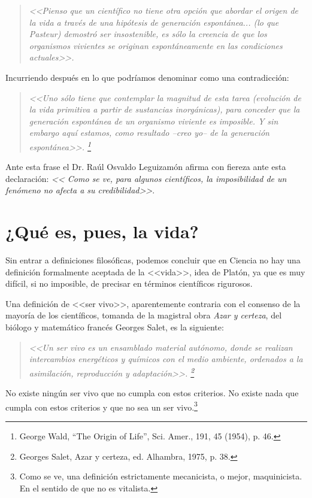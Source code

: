 \documentclass[11pt, oneside, titlepage]{book}
\begin{document}
    \begin{quote}
        \textit{
            <<Pienso que un científico no tiene otra opción que abordar el origen de la vida a través de una
            hipótesis de generación espontánea... (lo que Pasteur) demostró ser insostenible, es sólo la creencia
            de que los organismos vivientes se originan espontáneamente en las condiciones actuales>>.    
        }
    \end{quote}

    Incurriendo después en lo que podríamos denominar como una contradicción:

    \begin{quote}
        \textit{
            <<Uno sólo tiene que contemplar la magnitud de esta tarea (evolución de la vida primitiva a
            partir de sustancias inorgánicas), para conceder que la generación espontánea de un organismo viviente
            es imposible. Y sin embargo aquí estamos, como resultado --creo yo-- de la generación espontánea>>. 
            \footnote{
                George Wald, “The Origin of Life”, Sci. Amer., 191, 45 (1954), p. 46.
            }   
        }
    \end{quote}

    Ante esta frase el Dr. Raúl Osvaldo Leguizamón afirma con fiereza ante esta declaración: \textit{<<
    Como se ve, para algunos científicos, la imposibilidad de un fenómeno no afecta a su credibilidad>>}.

    \section{¿Qué es, pues, la vida?}

        Sin entrar a definiciones filosóficas, podemos concluir que en Ciencia no hay una definición formalmente 
        aceptada de la <<vida>>, idea de Platón, ya que es muy difícil, si no imposible, de precisar en términos 
        científicos rigurosos.

        Una definición de <<ser vivo>>, aparentemente contraria con el consenso de la mayoría de los científicos, 
        tomanda de la magistral obra \textit{Azar y certeza}, del biólogo y matemático francés Georges Salet, es 
        la siguiente:

        \begin{quote}
            \textit{
                <<Un ser vivo es un ensamblado material autónomo, donde se realizan intercambios energéticos y
                químicos con el medio ambiente, ordenados a la asimilación, reproducción y adaptación>>.
                \footnote{
                    Georges Salet, Azar y certeza, ed. Alhambra, 1975, p. 38.
                }
            }
        \end{quote}

        No existe ningún ser vivo que no cumpla con estos criterios. No existe nada que cumpla con estos
        criterios y que no sea un ser vivo.\footnote{
            Como se ve, una definición estrictamente mecanicista, o mejor, maquinicista. En el sentido de que
            no es vitalista.
        }   

\end{document}
